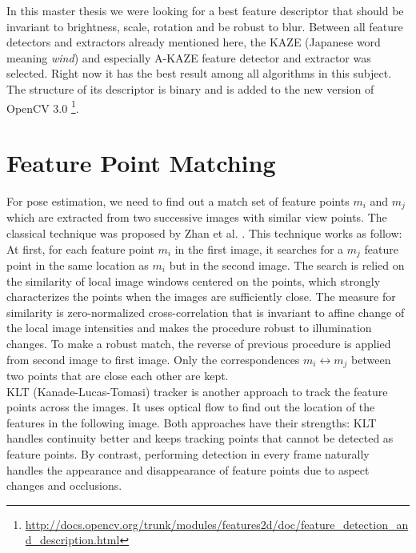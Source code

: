 In this master thesis we were looking for a best feature descriptor that should be invariant to brightness, scale, rotation and be robust to blur. Between all feature detectors and extractors already mentioned here, the KAZE (Japanese word meaning \emph{wind}) and especially A-KAZE feature detector and extractor was selected. Right now it has the best result among all algorithms in this subject. The structure of its descriptor is binary and is added to the new version of OpenCV 3.0 \footnote{\url{http://docs.opencv.org/trunk/modules/features2d/doc/feature_detection_and_description.html}}.

\section {Feature Point Matching}
For pose estimation, we need to find out a match set of feature points ${m_i}$ and ${m_j}$ which are extracted from two successive images with similar view points. The classical technique was proposed by Zhan et al. \cite{zhang1995robust}. This technique works as follow: At first, for each feature point ${m_i}$ in the first image, it searches for a ${m_j}$ feature point in the same location as ${m_i}$ but in the second image. The search is relied on the similarity of local image windows centered on the points, which strongly characterizes the points when the images are sufficiently close. The measure for similarity is zero-normalized cross-correlation that is invariant to affine change of the local image intensities and makes the procedure robust to illumination changes. To make a robust match, the reverse of previous procedure is applied from second image to first image. Only the correspondences ${m_i} \longleftrightarrow {m_j}$ between two points that are close each other are kept.\\
KLT (Kanade-Lucas-Tomasi) tracker \cite{tomasi1991detection} \cite{shi1994good} is another approach to track the feature points across the images. It uses optical flow to find out the location of the features in the following image. Both approaches have their strengths: KLT handles continuity better and keeps tracking points that cannot be detected as feature points. By contrast, performing detection in every frame naturally handles the appearance and disappearance of feature points due to aspect changes and occlusions.

